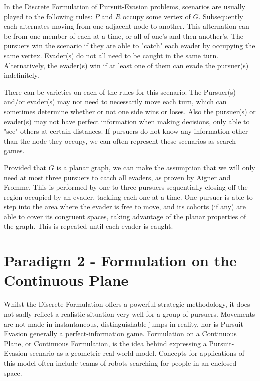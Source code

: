 \documentclass{article}
\begin{document}
In the Discrete Formulation of Pursuit-Evasion problems, scenarios are usually played to the following rules: \(P\) and \(R\) occupy some vertex of \(G\). Subsequently each alternates moving from one adjacent node to another. This alternation can be from one member of each at a time, or all of one's and then another's. The pursuers win the scenario if they are able to "catch" each evader by occupying the same vertex. Evader(s) do not all need to be caught in the same turn. Alternatively, the evader(s) win if at least one of them can evade the pursuer(s) indefinitely.\cite{copsRobbers}

There can be varieties on each of the rules for this scenario. The Pursuer(s) and/or evader(s) may not need to necessarily move each turn, which can sometimes determine whether or not one side wins or loses. Also the pursuer(s) or evader(s) may not have perfect information when making decisions, only able to "see" others at certain distances. If pursuers do not know any information other than the node they occupy, we can often represent these scenarios as search games. \cite{parsons}

Provided that \(G\) is a planar graph, we can make the assumption that we will only need at most three pursuers to catch all evaders, as proven by Aigner and Fromme. This is performed by one to three pursuers sequentially closing off the region occupied by an evader, tackling each one at a time. One pursuer is able to step into the area where the evader is free to move, and its cohorts (if any) are able to cover its congruent spaces, taking advantage of the planar properties of the graph. This is repeated until each evader is caught. \cite{copsRobbers}

\section{Paradigm 2 - Formulation on the Continuous Plane}
Whilst the Discrete Formulation offers a powerful strategic methodology, it does not sadly reflect a realistic situation very well for a group of pursuers. Movements are not made in instantaneous, distinguishable jumps in reality, nor is Pursuit-Evasion generally a perfect-information game. Formulation on a Continuous Plane, or Continuous Formulation, is the idea behind expressing a Pursuit-Evasion scenario as a geometric real-world model. Concepts for applications of this model often include teams of robots searching for people in an enclosed space.
\end{document}
